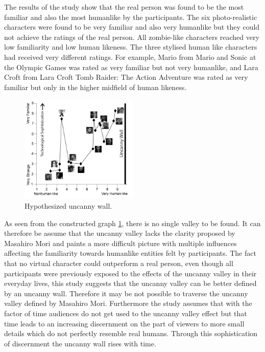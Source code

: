 The results of the study show that the real person was found to be the most familiar and also the most humanlike by the participants. The six photo-realistic characters were found to be very familiar and also very humanlike but they could not achieve the ratings of the real person. All zombie-like characters reached very low familiarity and low human likeness. 
The three stylised human like characters had received very different ratings. For example, Mario from Mario and Sonic at the Olympic Games was rated as very familiar but not very humanlike, and Lara Croft from Lara Croft Tomb Raider: The Action Adventure was rated as very familiar but only in the higher midfield of human likeness. 
\newpage
\begin{figure} %
    \centering
    \includegraphics[width=0.5\textwidth]{graphics/uncanny_wall_graph.png}
    \caption{Hypothesized uncanny wall.}
    \label{fig:uncannyWallGraph}
\end{figure}
As seen from the constructed graph \ref{fig:uncannyWallGraph}, there is no single valley to be found.
It can therefore be assume that the uncanny valley lacks the clarity proposed by Masahiro Mori and paints a more difficult picture with multiple influences affecting the familiarity towards humanlike entities felt by participants. The fact that no virtual character could outperform a real person, even though all participants were previously exposed to the effects of the uncanny valley in their everyday lives, this study suggests that the uncanny valley can be better defined by an uncanny wall. Therefore it may be not possible to traverse the uncanny valley defined by Masahiro Mori. Furthermore the study assumes that with the factor of time audiences do not get used to the uncanny valley effect but that time leads to an increasing discernment on the part of viewers to more small details which do not perfectly resemble real humans. Through this sophistication of discernment the uncanny wall rises with time.\\
